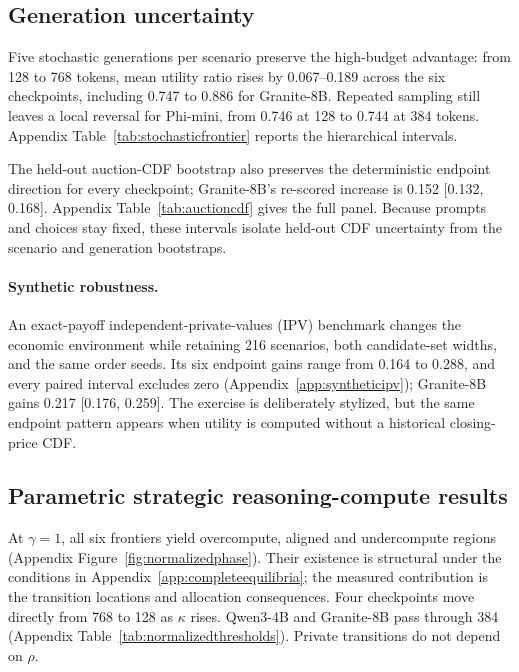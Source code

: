 \documentclass{article}
\begin{document}
\subsection{Generation uncertainty}

Five stochastic generations per scenario preserve the high-budget advantage: from 128 to 768 tokens, mean utility ratio rises by 0.067--0.189 across the six checkpoints, including 0.747 to 0.886 for Granite-8B. Repeated sampling still leaves a local reversal for Phi-mini, from 0.746 at 128 to 0.744 at 384 tokens. Appendix Table~\ref{tab:stochasticfrontier} reports the hierarchical intervals.

The held-out auction-CDF bootstrap also preserves the deterministic endpoint direction for every checkpoint; Granite-8B's re-scored increase is 0.152 [0.132, 0.168]. Appendix Table~\ref{tab:auctioncdf} gives the full panel. Because prompts and choices stay fixed, these intervals isolate held-out CDF uncertainty from the scenario and generation bootstraps.

\paragraph{Synthetic robustness.}
An exact-payoff independent-private-values (IPV) benchmark changes the economic environment while retaining 216 scenarios, both candidate-set widths, and the same order seeds. Its six endpoint gains range from 0.164 to 0.288, and every paired interval excludes zero (Appendix~\ref{app:syntheticipv}); Granite-8B gains 0.217 [0.176, 0.259]. The exercise is deliberately stylized, but the same endpoint pattern appears when utility is computed without a historical closing-price CDF.

\subsection{Parametric strategic reasoning-compute results}
\label{sec:strategicresults}

At $\gamma=1$, all six frontiers yield overcompute, aligned and undercompute regions (Appendix Figure~\ref{fig:normalizedphase}). Their existence is structural under the conditions in Appendix~\ref{app:completeequilibria}; the measured contribution is the transition locations and allocation consequences. Four checkpoints move directly from 768 to 128 as $\kappa$ rises. Qwen3-4B and Granite-8B pass through 384 (Appendix Table~\ref{tab:normalizedthresholds}). Private transitions do not depend on $\rho$.
\end{document}
